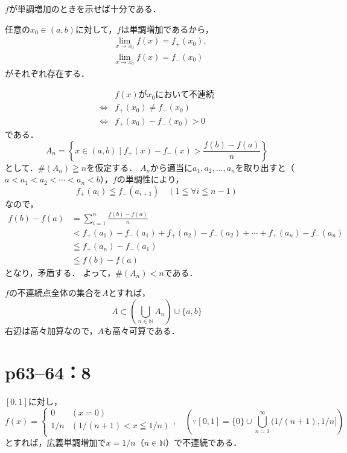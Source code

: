\begin{tproof} $f$が単調増加のときを示せば十分である．

    任意の$ x_0 \in (a,b)$に対して，$f$は単調増加であるから，
    \begin{align*}
         & \lim_{x \to x_0} f(x)=f_{+} (x_0) , \\
         & \lim_{x \to x_0} f(x)=f_{-} (x_0)
    \end{align*}
    がそれぞれ存在する．

    \begin{align*}
             & \text{$f(x)$が$x_0$において不連続}  \\
        \iff & f_{+} (x_0) \ne f_{-} (x_0) \\
        \iff & f_{+} (x_0) - f_{-} (x_0)>0
    \end{align*}
    である．
    \[
        A_n =  \left \{ x \in (a,b) \mid f_{+} (x) - f_{-} (x) > \frac{f(b)-f(a)}{n} \right \}
    \]
    として．$\# (A_n) \geqq n$を仮定する．
    $A_n$から適当に$a_1,a_2,\ldots,a_n$を取り出すと（$a<a_1 < a_2 < \cdots < a_n<b$），$f$の単調性により，
    \[
        f_{+} (a_i) \leqq f_{-} (a_{i+1}) \quad (1 \leqq \forall i \leqq n-1)
    \]
    なので，
    \begin{align*}
        f(b)-f(a) & = \sum_{i=1}^{n} \frac{f(b)-f(a)}{n}                                                         \\
                  & < f_{+} (a_1) - f_{-} (a_1) + f_{+} (a_2) - f_{-} (a_2) + \cdots + f_{+} (a_n) - f_{-} (a_n) \\
                  & \leqq f_{+} (a_n) - f_{-} (a_1)                                                              \\
                  & \leqq f(b)-f(a)
    \end{align*}
    となり，矛盾する．
    よって，$\# (A_n) < n$である．

    $f$の不連続点全体の集合を$A$とすれば，
    \[
        A \subset \left ( \bigcup_{n \in \mathbb{N}}  A_n \right ) \cup \{ a, b \}
    \]
    右辺は高々加算なので，$A$も高々可算である．
\end{tproof}

\section*{p63--64：8}
\begin{tanswer}
    $ [0,1]$に対し，
    \[
        f(x)= \begin{cases}
            0   & (x=0)                   \\
            1/n & (1/(n+1) < x \leqq 1/n) \\
        \end{cases}
        ,\quad \left ( \because [0,1] = \{ 0 \} \cup \bigcup_{n=1}^{\infty} (1/(n+1),1/n] \right )
    \]
    とすれば，広義単調増加で$x=1/n$（$n \in \mathbb{N}$）で不連続である．
\end{tanswer}
\newpage


